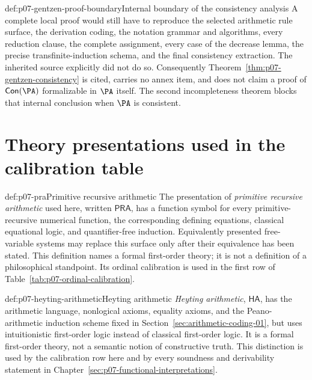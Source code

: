 \begin{proofboundary}{def:p07-gentzen-proof-boundary}{Internal boundary of the consistency analysis}
A complete local proof would still have to reproduce the selected arithmetic
rule surface, the derivation coding, the notation grammar and algorithms,
every reduction clause, the complete assignment, every case of the decrease
lemma, the precise transfinite-induction schema, and the final consistency
extraction.  The inherited source explicitly did not do so.  Consequently
Theorem~\ref{thm:p07-gentzen-consistency} is cited, carries no annex item, and
does not claim a proof of \(\mathsf{Con}(\PA)\) formalizable in \(\PA\)
itself.  The second incompleteness theorem blocks that internal conclusion
when \(\PA\) is consistent.
\end{proofboundary}


\begingroup
\renewcommand{\sectionmark}[1]{\markright{\thesection.\ THEORY PRESENTATIONS}}
\section{Theory presentations used in the calibration table}
\endgroup
\label{sec:p07-calibration-theories}

\begin{hbdefinition}{def:p07-pra}{Primitive recursive arithmetic}
The presentation of \emph{primitive recursive arithmetic} used here, written
\(\mathsf{PRA}\), has a function symbol for every primitive-recursive
numerical function, the corresponding defining equations, classical
equational logic, and quantifier-free induction.  Equivalently presented
free-variable systems may replace this surface only after their equivalence
has been stated.  This definition names a formal first-order theory; it is not
a definition of a philosophical standpoint.  Its ordinal calibration is used
in the first row of Table~\ref{tab:p07-ordinal-calibration}.
\end{hbdefinition}

\begin{hbdefinition}{def:p07-heyting-arithmetic}{Heyting arithmetic}
\emph{Heyting arithmetic}, \(\mathsf{HA}\), has the arithmetic language,
nonlogical axioms, equality axioms, and the Peano-arithmetic induction scheme
fixed in Section~\ref{sec:arithmetic-coding-01}, but uses intuitionistic
first-order logic instead of classical first-order logic.  It is a formal
first-order theory, not a semantic notion of constructive truth.  This
distinction is used by the calibration row here and by every soundness and
derivability statement in Chapter~\ref{sec:p07-functional-interpretations}.
\end{hbdefinition}


